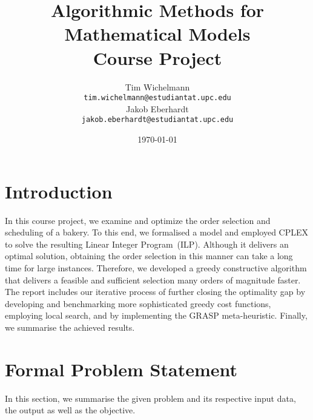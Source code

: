 \documentclass{article}
\title{Algorithmic Methods for Mathematical Models\\
  Course Project }
\author{Tim Wichelmann\\ \texttt{tim.wichelmann@estudiantat.upc.edu}\\[1ex] %
  Jakob Eberhardt\\ \texttt{jakob.eberhardt@estudiantat.upc.edu}}
\date{\today}
\begin{document}
\maketitle
\thispagestyle{empty}
\newpage
\setcounter{page}{1}
\tableofcontents
\listoffigures
\newpage

\section{Introduction}
In this course project, we examine and optimize the order selection and scheduling of a bakery. To this end, we formalised a model and employed CPLEX to solve the resulting Linear Integer Program~(ILP). Although it delivers an optimal solution, obtaining the order selection in this manner can take a long time for large instances. Therefore, we developed a greedy constructive algorithm that delivers a feasible and sufficient selection many orders of magnitude faster. The report includes our iterative process of further closing the optimality gap by developing and benchmarking more sophisticated greedy cost functions, employing local search, and by implementing the GRASP meta-heuristic. Finally, we summarise the achieved results. 

\section{Formal Problem Statement}
In this section, we summarise the given problem and its respective input data, the output as well as the objective.  
\end{document}
